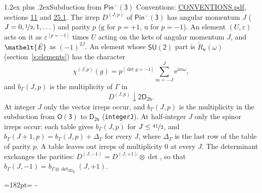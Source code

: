 \documentclass[10pt,a4paper]{article}
\makeatletter
\renewcommand\section{\@startsection{section}{1}{\z@}{-3ex plus -1ex minus -.2ex}%
  {1.2ex plus .2ex}{\normalfont\large\sffamily\bfseries\color{parttitle}}}
\newcommand{\needspace}[1]{\par\penalty-100\begingroup\dimen0=#1\relax\dimen2=\pagegoal
  \advance\dimen2-\pagetotal\ifdim\dimen0>\dimen2\relax\ifdim\dimen2>0pt\vfil\break\fi\fi
  \endgroup}
\numberwithin{equation}{section}
\newcommand{\eltfont}[1]{{\let\sigma\eltsigma\mathelt{#1}}}
\newcommand{\grp}[1]{\mathsf{#1}}
\newcommand{\elt}[1]{\eltfont{#1}}
\newcommand{\ptag}[1]{\mathrm{#1}}
\newcommand{\iverson}[1]{[#1]}
\newcommand{\restr}[2]{#1\!\downarrow#2}
\newcommand{\vv}{\mathbf{v}}
\newcommand{\iunit}{\mathrm{i}}
\newcommand{\expe}{\mathrm{e}}
\newcommand{\irrJp}[2]{D^{(#1,#2)}}
\newcommand{\irrprod}{\otimes}
\newcommand{\barred}[1]{\bar{#1}}
\newcommand{\lift}[1]{\tilde{#1}}
\makeatother
\begin{document}
\section{Subduction from \texorpdfstring{$\grp{Pin^{-}(3)}$}{Pin(3)}}\label{s:subduction_parent}
Conventions: \href{../../CONVENTIONS.pdf}{CONVENTIONS.pdf}, sections \href{../../../rotation/CONVENTIONS.pdf\#conv.11}{11} and \href{../../CONVENTIONS.pdf\#conv.25.1}{25.1}.
\leavevmode\label{n:index.J}\label{n:index.parity}\label{n:irrep.o3}The irrep $\irrJp{J}{p}$ of \href{Pinminus3.pdf}{$\grp{Pin^{-}(3)}$} has angular momentum $J$ ($J = 0, \nicefrac{1}{2}, 1, \dots$) and parity $p$ ($\ptag{g}$ for $p = +1$, $\ptag{u}$ for $p = -1$). An element $(U, \varepsilon)$ acts on it as $\varepsilon^{[p = -1]}$ times $U$ acting on the kets of angular momentum $J$, and $\elt{\barred{E}}$ as $(-1)^{2J}$. \label{n:function.character.parent}\label{n:function.multiplicity}An element whose $\grp{SU(2)}$ part is $\lift{R}_{\vv}(\omega)$ (section~\ref{s:elements}) has the character
\begin{equation}\label{e:chi}\chi^{(J,p)}(g) = p^{\iverson{\det g = -1}}\sum_{m=-J}^{J} \expe^{\iunit m\omega},\end{equation}
and $b_\Gamma(J, p)$ is the multiplicity of $\Gamma$ in
\begin{equation}\label{e:parent}\restr{\irrJp{J}{p}}{\grp{2D_{2h}}}.\end{equation}
At integer $J$ only the vector irreps occur, and $b_\Gamma(J, p)$ is the multiplicity in the subduction from $\grp{O(3)}$ to \href{../../../rotation/data/pdf/D2h.pdf}{$\grp{D_{2h}}$} (\texttt{integerJ}). \label{n:index.increment}At half-integer $J$ only the spinor irreps occur: each table gives $b_\Gamma(J, p)$ for $J \le \nicefrac{41}{2}$, and $b_\Gamma(J + 1, p) = b_\Gamma(J, p) + \Delta_\Gamma$ for every $J$, where $\Delta_\Gamma$ is the last row of the table of parity $p$. A table leaves out irreps of multiplicity 0 at every $J$.
\leavevmode\label{n:operator.determinant.character}The determinant exchanges the parities: $\irrJp{J}{-1} = \irrJp{J}{+1} \irrprod \det$, so that $b_\Gamma(J, -1) = b_{\Gamma \irrprod \det_{\grp{2D_{2h}}}}(J, +1)$.
\needspace{182pt}
\end{document}
